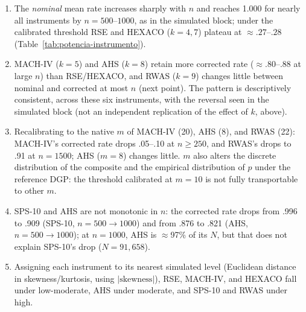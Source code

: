 \documentclass[man,mask,donotrepeattitle,floatsintext]{apa7}
\begin{document}
\begin{enumerate}
\item The \emph{nominal} mean rate increases sharply with $n$ and reaches 1.000 for nearly all instruments by $n=500$--$1000$, as in the simulated block; under the calibrated threshold RSE and HEXACO ($k=4,7$) plateau at $\approx.27$--$.28$ (Table~\ref{tab:potencia-instrumento}).
\item MACH-IV ($k=5$) and AHS ($k=8$) retain more corrected rate ($\approx.80$--$.88$ at large $n$) than RSE/HEXACO, and RWAS ($k=9$) changes little between nominal and corrected at most $n$ (next point). The pattern is descriptively consistent, across these six instruments, with the reversal seen in the simulated block (not an independent replication of the effect of $k$, above).
\item Recalibrating to the native $m$ of MACH-IV (20), AHS (8), and RWAS (22): MACH-IV's corrected rate drops .05--.10 at $n\geq250$, and RWAS's drops to .91 at $n=1500$; AHS ($m=8$) changes little. $m$ also alters the discrete distribution of the composite and the empirical distribution of $p$ under the reference DGP: the threshold calibrated at $m=10$ is not fully transportable to other $m$.
\item SPS-10 and AHS are not monotonic in $n$: the corrected rate drops from .996 to .909 (SPS-10, $n=500\to1000$) and from .876 to .821 (AHS, $n=500\to1000$); at $n=1000$, AHS is $\approx$97\% of its $N$, but that does not explain SPS-10's drop ($N=91,658$).
\item Assigning each instrument to its nearest simulated level (Euclidean distance in skewness/kurtosis, using $|\text{skewness}|$), RSE, MACH-IV, and HEXACO fall under low-moderate, AHS under moderate, and SPS-10 and RWAS under high.
\end{enumerate}
\end{document}

